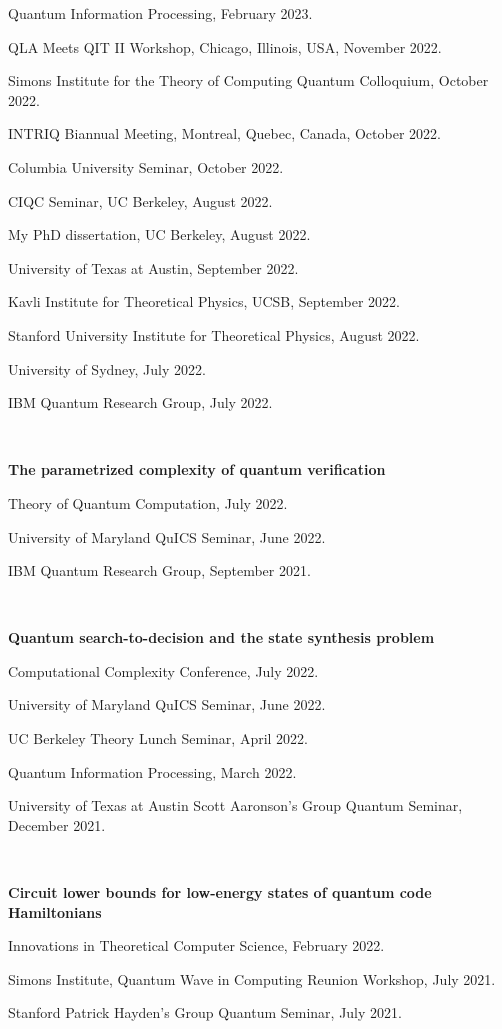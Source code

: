 \documentclass[11pt]{article}
\begin{document}
Quantum Information Processing, February 2023.

QLA Meets QIT II Workshop, Chicago, Illinois, USA, November 2022.

Simons Institute for the Theory of Computing Quantum Colloquium, October 2022.

INTRIQ Biannual Meeting, Montreal, Quebec, Canada, October 2022.

Columbia University Seminar, October 2022.

CIQC Seminar, UC Berkeley, August 2022.

My PhD dissertation, UC Berkeley, August 2022.

University of Texas at Austin, September 2022.

Kavli Institute for Theoretical Physics, UCSB, September 2022.

Stanford University Institute for Theoretical Physics, August 2022.

University of Sydney, July 2022.

IBM Quantum Research Group, July 2022.

\

\textbf{The parametrized complexity of quantum verification}

Theory of Quantum Computation, July 2022.

University of Maryland QuICS Seminar, June 2022.

IBM Quantum Research Group, September 2021.

\

\textbf{Quantum search-to-decision and the state synthesis problem}

Computational Complexity Conference, July 2022.

University of Maryland QuICS Seminar, June 2022.

UC Berkeley Theory Lunch Seminar, April 2022.

Quantum Information Processing, March 2022.

University of Texas at Austin Scott Aaronson's Group Quantum Seminar, December 2021.

\

\textbf{Circuit lower bounds for low-energy states of quantum code Hamiltonians}

Innovations in Theoretical Computer Science, February 2022.

Simons Institute, Quantum Wave in Computing Reunion Workshop, July 2021.

Stanford Patrick Hayden's Group Quantum Seminar, July 2021.
\end{document}
